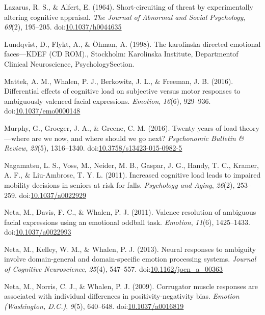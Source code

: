 \documentclass[man]{apa6}
\begin{document}
\leavevmode\hypertarget{ref-lazarus_short-circuiting_1964}{}%
Lazarus, R. S., \& Alfert, E. (1964). Short-circuiting of threat by experimentally altering cognitive appraisal. \emph{The Journal of Abnormal and Social Psychology}, \emph{69}(2), 195--205. doi:\href{https://doi.org/10.1037/h0044635}{10.1037/h0044635}

\leavevmode\hypertarget{ref-lundqvist_karolinska_1998}{}%
Lundqvist, D., Flykt, A., \& Öhman, A. (1998). The karolinska directed emotional faces---KDEF (CD ROM)., Stockholm: Karolinska Institute, Departmentof Clinical Neuroscience, PsychologySection.

\leavevmode\hypertarget{ref-mattek_differential_2016}{}%
Mattek, A. M., Whalen, P. J., Berkowitz, J. L., \& Freeman, J. B. (2016). Differential effects of cognitive load on subjective versus motor responses to ambiguously valenced facial expressions. \emph{Emotion}, \emph{16}(6), 929--936. doi:\href{https://doi.org/10.1037/emo0000148}{10.1037/emo0000148}

\leavevmode\hypertarget{ref-murphy_twenty_2016}{}%
Murphy, G., Groeger, J. A., \& Greene, C. M. (2016). Twenty years of load theory---where are we now, and where should we go next? \emph{Psychonomic Bulletin \& Review}, \emph{23}(5), 1316--1340. doi:\href{https://doi.org/10.3758/s13423-015-0982-5}{10.3758/s13423-015-0982-5}

\leavevmode\hypertarget{ref-nagamatsu_increased_2011}{}%
Nagamatsu, L. S., Voss, M., Neider, M. B., Gaspar, J. G., Handy, T. C., Kramer, A. F., \& Liu-Ambrose, T. Y. L. (2011). Increased cognitive load leads to impaired mobility decisions in seniors at risk for falls. \emph{Psychology and Aging}, \emph{26}(2), 253--259. doi:\href{https://doi.org/10.1037/a0022929}{10.1037/a0022929}

\leavevmode\hypertarget{ref-neta_valence_2011}{}%
Neta, M., Davis, F. C., \& Whalen, P. J. (2011). Valence resolution of ambiguous facial expressions using an emotional oddball task. \emph{Emotion}, \emph{11}(6), 1425--1433. doi:\href{https://doi.org/10.1037/a0022993}{10.1037/a0022993}

\leavevmode\hypertarget{ref-neta_neural_2013}{}%
Neta, M., Kelley, W. M., \& Whalen, P. J. (2013). Neural responses to ambiguity involve domain-general and domain-specific emotion processing systems. \emph{Journal of Cognitive Neuroscience}, \emph{25}(4), 547--557. doi:\href{https://doi.org/10.1162/jocn_a_00363}{10.1162/jocn\_a\_00363}

\leavevmode\hypertarget{ref-neta_corrugator_2009}{}%
Neta, M., Norris, C. J., \& Whalen, P. J. (2009). Corrugator muscle responses are associated with individual differences in positivity-negativity bias. \emph{Emotion (Washington, D.C.)}, \emph{9}(5), 640--648. doi:\href{https://doi.org/10.1037/a0016819}{10.1037/a0016819}
\end{document}

